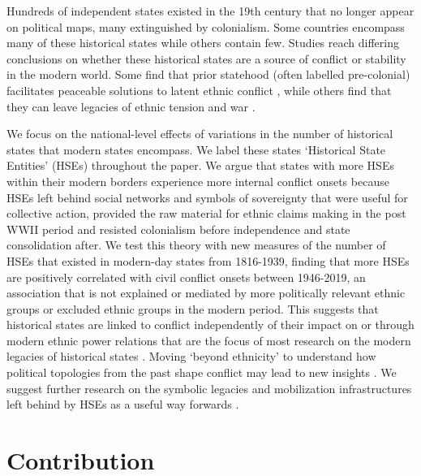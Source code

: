 Hundreds of independent states existed in the 19th century that no longer appear
on political maps, many extinguished by colonialism. Some countries encompass
many of these historical states while others contain few. Studies reach
differing conclusions on whether these historical states are a source of
conflict or stability in the modern world. Some find that prior statehood (often
labelled pre-colonial) facilitates peaceable solutions to latent ethnic conflict
\citep{Depetris-Chauvin2016, Wig2016}, while others find that they can leave
legacies of ethnic tension and war \citep{Besley2014, Paine2019, Englebert2000,
Alesina2003}. 

We focus on the national-level effects of variations in the number of historical
states that modern states encompass. We label these states `Historical State
Entities' (HSEs) throughout the paper. We argue that states with more HSEs
within their modern borders experience more internal conflict onsets because
HSEs left behind social networks and symbols of sovereignty that were useful for
collective action, provided the raw material for ethnic claims making in the
post WWII period and resisted colonialism before independence and state
consolidation after. We test this theory with new measures of the number of HSEs
that existed in modern-day states from 1816-1939, finding that more HSEs are
positively correlated with civil conflict onsets between 1946-2019, an
association that is not explained or mediated by more politically relevant
ethnic groups or excluded ethnic groups in the modern period. This suggests that
historical states are linked to conflict independently of their impact on or
through modern ethnic power relations that are the focus of most research on the
modern legacies of historical states \citep{Paine2019, Wig2016}. Moving `beyond
ethnicity' to understand how political topologies from the past shape conflict
may lead to new insights \citep{Herbst2014, Blaydes2013, Mazzuca2021}. We
suggest further research on the symbolic legacies and mobilization
infrastructures left behind by HSEs as a useful way forwards \citep{Ahram2019}. 

\section{Contribution}

